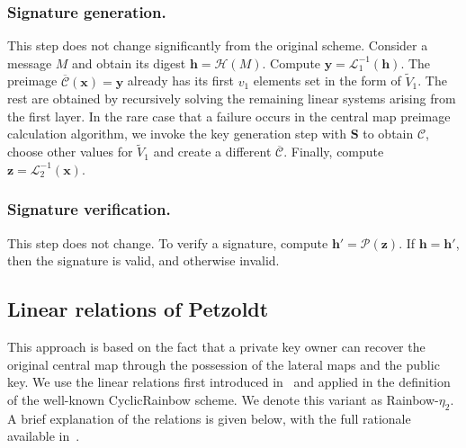 \documentclass[12pt, a4paper, oneside]{memoir}
\theoremstyle{definition}
\begin{document}
\subsubsection{Signature generation.}

This step does not change significantly from the original scheme. Consider a message $M$ and obtain its digest $\mathbf{h} = \mathcal{H}(M)$. Compute $\mathbf{y} = \mathcal{L}_{1}^{-1}(\mathbf{h})$. The preimage $\overline{\mathcal{C}}(\mathbf{x}) = \mathbf{y}$ already has its first $v_{1}$ elements set in the form of $\widetilde{V}_{1}$. The rest are obtained by recursively solving the remaining linear systems arising from the first layer. In the rare case that a failure occurs in the central map preimage calculation algorithm, we invoke the key generation step with $\mathbf{S}$ to obtain $\mathcal{C}$, choose other values for $\widetilde{V}_{1}$ and create a different $\overline{\mathcal{C}}$. Finally, compute $\mathbf{z} = \mathcal{L}_{2}^{-1}(\mathbf{x})$.

\subsubsection{Signature verification.}

This step does not change. To verify a signature, compute $\mathbf{h'} = \mathcal{P}(\mathbf{z})$. If $\mathbf{h} = \mathbf{h'}$, then the signature is valid, and otherwise invalid.

\subsection{Linear relations of Petzoldt}\label{subsec:linear}

This approach is based on the fact that a private key owner can recover the original central map through the possession of the lateral maps and the public key. We use the linear relations first introduced in~\cite{Petzoldt:201006} and applied in the definition of the well-known CyclicRainbow scheme. We denote this variant as Rainbow-$\eta_{2}$. A brief explanation of the relations is given below, with the full rationale available in~\cite[Chap.~7]{Petzoldt:201307}.
\end{document}
